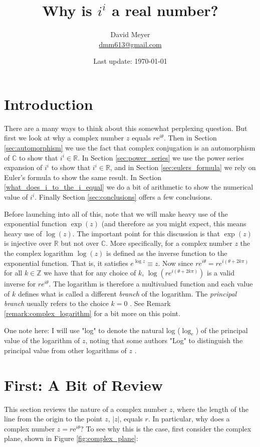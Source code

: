 \documentclass{article}
\title{Why is $i^i$ a real number?}
\author{David Meyer \\ \href{mailto:dmm613@gmail.com}
                            {dmm613@gmail.com}}
\date{Last update: \today}
\theoremstyle{definition}
\begin{document}
\maketitle
%
%
%
\section{Introduction}
There are a many ways to think about this somewhat perplexing
question. But first we look at why a complex number $z$ equals
$r\mathrm{e}^{i \theta}$. Then in Section \ref{sec:automorphism}
we use the fact that complex conjugation is an automorphism of
$\mathbb{C}$ to show that $i^i \in \mathbb{R}$.  In Section
\ref{sec:power_series} we use the power series expansion of $i^i$
to show that $i^i \in \mathbb{R}$, and in Section
\ref{sec:eulers_formula} we rely on Euler's formula to show the
same result. In Section \ref{what_does_i_to_the_i_equal} we do a
bit of arithmetic to show the numerical value of $i^i$. Finally
Section \ref{sec:conclusions} offers a few conclusions.

\bigskip
\noindent
Before launching into all of this, note that we will make heavy
use of the exponential function $\exp(z)$ (and therefore as you
might expect, this means heavy use of $\log(z)$. The important
point for this discussion is that $\exp(z)$ is injective over
$\mathbb{R}$ but not over $\mathbb{C}$. More specifically, for a
complex number $z$ the the complex logarithm $\log(z)$ is defined
as the inverse function to the exponential function. That is, it
satisfies $e^{\log z} \equiv z$. Now since $re^{i\theta} =
re^{i(\theta+2k\pi)}$ for all $k \in \mathbb{Z}$ we have that for
any choice of $k$, $\log(re^{i(\theta+2k\pi)})$ is a valid
inverse for $re^{i\theta}$. The logarithm is therefore a
multivalued function and each value of $k$ defines what is called
a different \emph{branch} of the logarithm. The \emph{principal branch}
usually refers to the choice $k=0$ \cite{wiki:principle_branch}. 
See Remark \ref{remark:complex_logarithm} for a bit more on this point.


\bigskip
\noindent
One note here: I will use "log" to denote the natural log ($\log_{e}$) 
of the principal value of the logarithm of $z$, noting that some 
authors "Log" to distinguish the principal value from other logarithms 
of $z$ \cite{wiki:complex_logarithm}. 
%
%
%
\section{First: A Bit of Review}
\label{sec:why_is_z_equal_r}
This section reviews the nature of a complex number $z$, where
the length of the line from the origin to the point $z$, $|z|$,
equals $r$. In particular, why does a complex number $z = r 
\mathrm{e}^{i \theta}$? To see why this is the case, first 
consider the complex plane, shown in Figure \ref{fig:complex_plane}:
\end{document}
